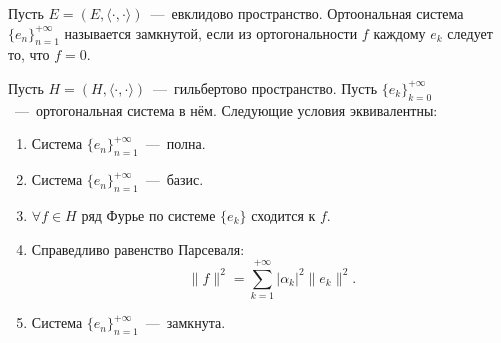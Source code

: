 \begin{definition}
    Пусть $E = (E, \langle \cdot, \cdot \rangle)$~---~евклидово пространство.
    Ортоональная система $\{e_n\}_{n = 1}^{+\infty}$ называется замкнутой, если из ортогональности $f$ каждому $e_k$ следует то, что $f = 0$.
\end{definition}
\begin{theorem}
    Пусть $H = (H, \langle \cdot, \cdot \rangle)$~---~гильбертово пространство.
    Пусть $\{e_k\}_{k = 0}^{+\infty}$~---~ортогональная система в нём.
    Следующие условия эквивалентны:
    \begin{enumerate}
        \item Система $\{e_n\}_{n = 1}^{+\infty}$~---~полна.
        \item Система $\{e_n\}_{n = 1}^{+\infty}$~---~базис.
        \item $\forall f \in H$ ряд Фурье по системе $\{e_k\}$ сходится к $f$.
        \item Справедливо равенство Парсеваля:
        \[
            \|f\|^2 = \sum\limits_{k = 1}^{+\infty} |\alpha_k|^2 \|e_k\|^2.
        \]
        \item Система $\{e_n\}_{n = 1}^{+\infty}$~---~замкнута.
    \end{enumerate}
\end{theorem}
